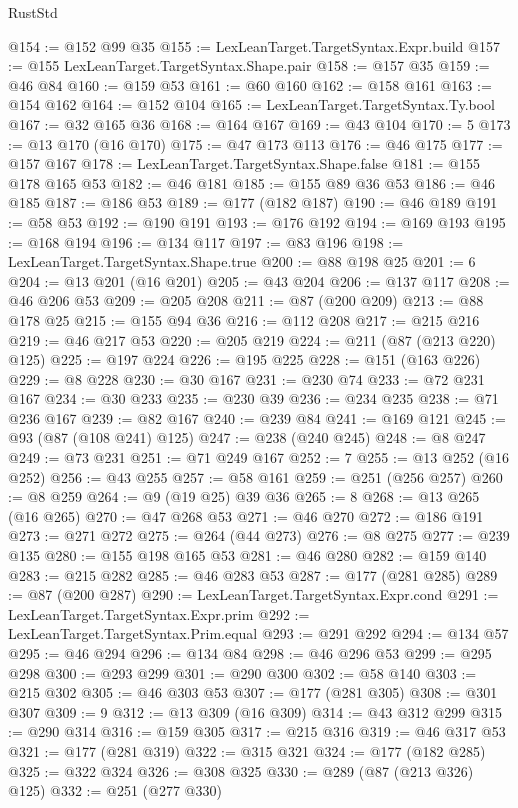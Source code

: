 \begin{lexlean}{RustStd}
\begin{coremodule}
@154 := @152 @99 @35
@155 := LexLeanTarget.TargetSyntax.Expr.build
@157 := @155 LexLeanTarget.TargetSyntax.Shape.pair
@158 := @157 @35
@159 := @46 @84
@160 := @159 @53
@161 := @60 @160
@162 := @158 @161
@163 := @154 @162
@164 := @152 @104
@165 := LexLeanTarget.TargetSyntax.Ty.bool
@167 := @32 @165 @36
@168 := @164 @167
@169 := @43 @104
@170 := 5
@173 := @13 @170 (@16 @170)
@175 := @47 @173 @113
@176 := @46 @175
@177 := @157 @167
@178 := LexLeanTarget.TargetSyntax.Shape.false
@181 := @155 @178 @165 @53
@182 := @46 @181
@185 := @155 @89 @36 @53
@186 := @46 @185
@187 := @186 @53
@189 := @177 (@182 @187)
@190 := @46 @189
@191 := @58 @53
@192 := @190 @191
@193 := @176 @192
@194 := @169 @193
@195 := @168 @194
@196 := @134 @117
@197 := @83 @196
@198 := LexLeanTarget.TargetSyntax.Shape.true
@200 := @88 @198 @25
@201 := 6
@204 := @13 @201 (@16 @201)
@205 := @43 @204
@206 := @137 @117
@208 := @46 @206 @53
@209 := @205 @208
@211 := @87 (@200 @209)
@213 := @88 @178 @25
@215 := @155 @94 @36
@216 := @112 @208
@217 := @215 @216
@219 := @46 @217 @53
@220 := @205 @219
@224 := @211 (@87 (@213 @220) @125)
@225 := @197 @224
@226 := @195 @225
@228 := @151 (@163 @226)
@229 := @8 @228
@230 := @30 @167
@231 := @230 @74
@233 := @72 @231 @167
@234 := @30 @233
@235 := @230 @39
@236 := @234 @235
@238 := @71 @236 @167
@239 := @82 @167
@240 := @239 @84
@241 := @169 @121
@245 := @93 (@87 (@108 @241) @125)
@247 := @238 (@240 @245)
@248 := @8 @247
@249 := @73 @231
@251 := @71 @249 @167
@252 := 7
@255 := @13 @252 (@16 @252)
@256 := @43 @255
@257 := @58 @161
@259 := @251 (@256 @257)
@260 := @8 @259
@264 := @9 (@19 @25) @39 @36
@265 := 8
@268 := @13 @265 (@16 @265)
@270 := @47 @268 @53
@271 := @46 @270
@272 := @186 @191
@273 := @271 @272
@275 := @264 (@44 @273)
@276 := @8 @275
@277 := @239 @135
@280 := @155 @198 @165 @53
@281 := @46 @280
@282 := @159 @140
@283 := @215 @282
@285 := @46 @283 @53
@287 := @177 (@281 @285)
@289 := @87 (@200 @287)
@290 := LexLeanTarget.TargetSyntax.Expr.cond
@291 := LexLeanTarget.TargetSyntax.Expr.prim
@292 := LexLeanTarget.TargetSyntax.Prim.equal
@293 := @291 @292
@294 := @134 @57
@295 := @46 @294
@296 := @134 @84
@298 := @46 @296 @53
@299 := @295 @298
@300 := @293 @299
@301 := @290 @300
@302 := @58 @140
@303 := @215 @302
@305 := @46 @303 @53
@307 := @177 (@281 @305)
@308 := @301 @307
@309 := 9
@312 := @13 @309 (@16 @309)
@314 := @43 @312 @299
@315 := @290 @314
@316 := @159 @305
@317 := @215 @316
@319 := @46 @317 @53
@321 := @177 (@281 @319)
@322 := @315 @321
@324 := @177 (@182 @285)
@325 := @322 @324
@326 := @308 @325
@330 := @289 (@87 (@213 @326) @125)
@332 := @251 (@277 @330)

\end{coremodule}
\end{lexlean}
